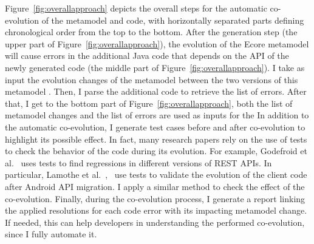 Figure~\ref{fig:overallapproach} depicts the overall steps for the automatic co-evolution of the metamodel and code, with horizontally separated parts defining chronological order from the top to the bottom.
After the generation step (the upper part of Figure~\ref{fig:overallapproach}), the evolution of the Ecore metamodel will cause errors in the additional Java code that depends on the API of the newly generated code (the middle part of Figure~\ref{fig:overallapproach}). I take as input the evolution changes of the metamodel between the two versions of this metamodel {\small{}}. Then, I parse the additional code  {\small{}} to retrieve the list of errors. 
After that, I get to the bottom part of Figure~\ref{fig:overallapproach}, both the list of metamodel changes and the list of errors are used as inputs for the  
In addition to the automatic co-evolution, I generate test cases before and after co-evolution to highlight its possible effect. In fact, many research papers rely on the use of tests to check the behavior of the code during its evolution. For example, Godefroid et al.~\cite{10.1145/3395363.3397374} uses tests to find regressions in different versions of REST APIs. In particular, Lamothe et al.~\cite{9079197},~\cite{10.1145/3387905.3388608} use tests to validate the evolution of the client code after Android API migration. I apply a similar method to check the effect of the co-evolution. 
Finally, during the co-evolution process, I generate a report linking the applied resolutions for each code error with its impacting metamodel change. If needed, this can help developers in understanding the performed co-evolution, since I fully automate it.
